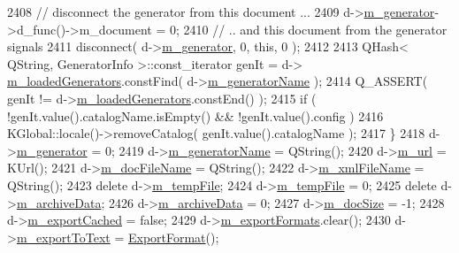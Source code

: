 \begin{DoxyCode}
2408         \textcolor{comment}{// disconnect the generator from this document ...}
2409         d->\hyperlink{classOkular_1_1DocumentPrivate_a52083f79ce95756ddea060e74315e91f}{m\_generator}->d\_func()->m\_document = 0;
2410         \textcolor{comment}{// .. and this document from the generator signals}
2411         disconnect( d->\hyperlink{classOkular_1_1DocumentPrivate_a52083f79ce95756ddea060e74315e91f}{m\_generator}, 0, \textcolor{keyword}{this}, 0 );
2412 
2413         QHash< QString, GeneratorInfo >::const\_iterator genIt = d->
      \hyperlink{classOkular_1_1DocumentPrivate_a449d3ae52e95d649dba62225f20a4195}{m\_loadedGenerators}.constFind( d->\hyperlink{classOkular_1_1DocumentPrivate_a4f02c151d836f43f47a6eeb614b25bf0}{m\_generatorName} );
2414         Q\_ASSERT( genIt != d->\hyperlink{classOkular_1_1DocumentPrivate_a449d3ae52e95d649dba62225f20a4195}{m\_loadedGenerators}.constEnd() );
2415         \textcolor{keywordflow}{if} ( !genIt.value().catalogName.isEmpty() && !genIt.value().config )
2416             KGlobal::locale()->removeCatalog( genIt.value().catalogName );
2417     \}
2418     d->\hyperlink{classOkular_1_1DocumentPrivate_a52083f79ce95756ddea060e74315e91f}{m\_generator} = 0;
2419     d->\hyperlink{classOkular_1_1DocumentPrivate_a4f02c151d836f43f47a6eeb614b25bf0}{m\_generatorName} = QString();
2420     d->\hyperlink{classOkular_1_1DocumentPrivate_a1a0145bbb16d15c016000a83d0d2ab2b}{m\_url} = KUrl();
2421     d->\hyperlink{classOkular_1_1DocumentPrivate_af56dcee87c3465c69da7cea920b95fbb}{m\_docFileName} = QString();
2422     d->\hyperlink{classOkular_1_1DocumentPrivate_aae08e3c4d234247bf3d52608649e7c64}{m\_xmlFileName} = QString();
2423     \textcolor{keyword}{delete} d->\hyperlink{classOkular_1_1DocumentPrivate_a09a610ec7c029dd3b73580abfc65059d}{m\_tempFile};
2424     d->\hyperlink{classOkular_1_1DocumentPrivate_a09a610ec7c029dd3b73580abfc65059d}{m\_tempFile} = 0;
2425     \textcolor{keyword}{delete} d->\hyperlink{classOkular_1_1DocumentPrivate_a135bb6fa2886b0eb86e9a1b72fd8d25b}{m\_archiveData};
2426     d->\hyperlink{classOkular_1_1DocumentPrivate_a135bb6fa2886b0eb86e9a1b72fd8d25b}{m\_archiveData} = 0;
2427     d->\hyperlink{classOkular_1_1DocumentPrivate_afe0b6665f1386848faf6e6763e7f6cf4}{m\_docSize} = -1;
2428     d->\hyperlink{classOkular_1_1DocumentPrivate_ad738776539c25a2b18b0d482c406b424}{m\_exportCached} = \textcolor{keyword}{false};
2429     d->\hyperlink{classOkular_1_1DocumentPrivate_a674e49f7a287a70630bc5550b1a44169}{m\_exportFormats}.clear();
2430     d->\hyperlink{classOkular_1_1DocumentPrivate_a6c71a54787a3a6d6c16f79e2eb77ebbd}{m\_exportToText} = \hyperlink{classOkular_1_1ExportFormat}{ExportFormat}();

\end{DoxyCode}
